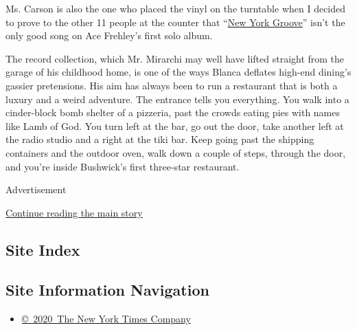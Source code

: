 Ms. Carson is also the one who placed the vinyl on the turntable when I
decided to prove to the other 11 people at the counter that
``\href{https://www.youtube.com/watch?v=gyq0Sk-I0Ck}{New York Groove}''
isn't the only good song on Ace Frehley's first solo album.

The record collection, which Mr. Mirarchi may well have lifted straight
from the garage of his childhood home, is one of the ways Blanca
deflates high-end dining's gassier pretensions. His aim has always been
to run a restaurant that is both a luxury and a weird adventure. The
entrance tells you everything. You walk into a cinder-block bomb shelter
of a pizzeria, past the crowds eating pies with names like Lamb of God.
You turn left at the bar, go out the door, take another left at the
radio studio and a right at the tiki bar. Keep going past the shipping
containers and the outdoor oven, walk down a couple of steps, through
the door, and you're inside Bushwick's first three-star restaurant.

Advertisement

\protect\hyperlink{after-bottom}{Continue reading the main story}

\hypertarget{site-index}{%
\subsection{Site Index}\label{site-index}}

\hypertarget{site-information-navigation}{%
\subsection{Site Information
Navigation}\label{site-information-navigation}}

\begin{itemize}
\tightlist
\item
  \href{https://help.nytimes3xbfgragh.onion/hc/en-us/articles/115014792127-Copyright-notice}{©~2020~The
  New York Times Company}
\end{itemize}

